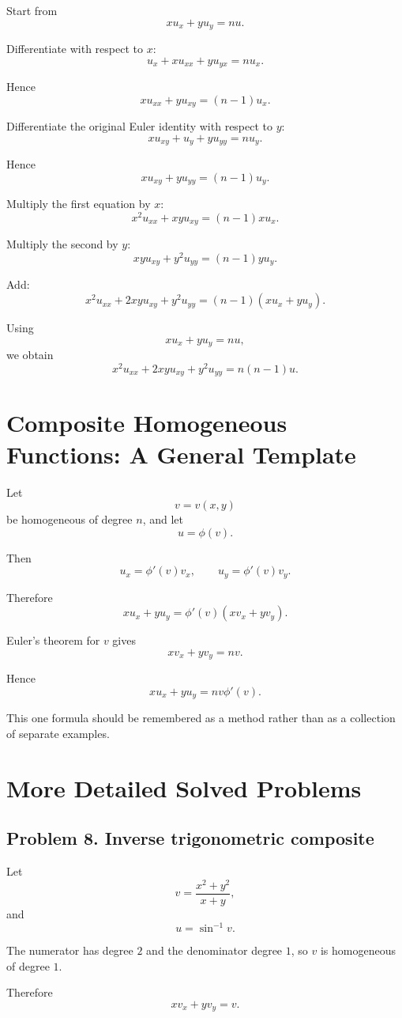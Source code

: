 \documentclass[11pt,oneside]{book}
\theoremstyle{studentthm}
\theoremstyle{definition}
\begin{document}
Start from
\[
xu_x+yu_y=nu.
\]

Differentiate with respect to \(x\):
\[
u_x+xu_{xx}+yu_{yx}=nu_x.
\]

Hence
\[
xu_{xx}+yu_{xy}
=
(n-1)u_x.
\]

Differentiate the original Euler identity with respect to \(y\):
\[
xu_{xy}+u_y+yu_{yy}=nu_y.
\]

Hence
\[
xu_{xy}+yu_{yy}
=
(n-1)u_y.
\]

Multiply the first equation by \(x\):
\[
x^2u_{xx}+xyu_{xy}
=
(n-1)xu_x.
\]

Multiply the second by \(y\):
\[
xyu_{xy}+y^2u_{yy}
=
(n-1)yu_y.
\]

Add:
\[
x^2u_{xx}
+
2xyu_{xy}
+
y^2u_{yy}
=
(n-1)(xu_x+yu_y).
\]

Using
\[
xu_x+yu_y=nu,
\]
we obtain
\[
x^2u_{xx}
+
2xyu_{xy}
+
y^2u_{yy}
=
n(n-1)u.
\]

\section{Composite Homogeneous Functions: A General Template}

Let
\[
v=v(x,y)
\]
be homogeneous of degree \(n\), and let
\[
u=\phi(v).
\]

Then
\[
u_x=\phi'(v)v_x,
\qquad
u_y=\phi'(v)v_y.
\]

Therefore
\[
xu_x+yu_y
=
\phi'(v)(xv_x+yv_y).
\]

Euler's theorem for \(v\) gives
\[
xv_x+yv_y=nv.
\]

Hence
\[
xu_x+yu_y
=
nv\phi'(v).
\]

This one formula should be remembered as a method rather than as a
collection of separate examples.

\section{More Detailed Solved Problems}

\subsection*{Problem 8. Inverse trigonometric composite}

Let
\[
v=\frac{x^2+y^2}{x+y},
\]
and
\[
u=\sin^{-1}v.
\]

The numerator has degree \(2\) and the denominator degree \(1\), so
\(v\) is homogeneous of degree \(1\).

Therefore
\[
xv_x+yv_y=v.
\]
\end{document}

